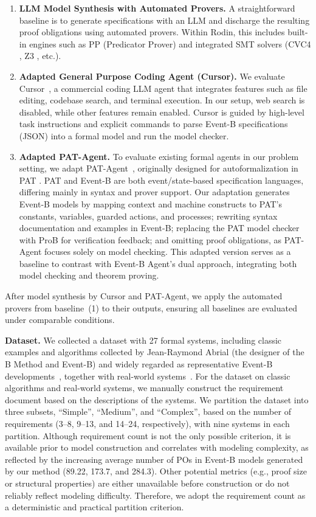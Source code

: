\begin{enumerate}
    \item \textbf{LLM Model Synthesis with Automated Provers.} A straightforward baseline is to generate specifications with an LLM and discharge the resulting proof obligations using automated provers. Within Rodin, this includes built-in engines such as PP (Predicator Prover) and integrated SMT solvers (CVC4 \cite{barrett2011cvc4}, Z3 \cite{de2008z3}, etc.).
    \item \textbf{Adapted General Purpose Coding Agent (Cursor).} We evaluate Cursor~\cite{CursorAI}, a commercial coding LLM agent that integrates features such as file editing, codebase search, and terminal execution. In our setup, web search is disabled, while other features remain enabled. Cursor is guided by high-level task instructions and explicit commands to parse Event-B specifications (JSON) into a formal model and run the model checker.
    \item \textbf{Adapted PAT-Agent.} To evaluate existing formal agents in our problem setting, we adapt PAT-Agent~\cite{zuo2025pat}, originally designed for autoformalization in PAT \cite{sun2009pat}. PAT and Event-B are both event/state-based specification languages, differing mainly in syntax and prover support. Our adaptation generates Event-B models by mapping context and machine constructs to PAT’s constants, variables, guarded actions, and processes; rewriting syntax documentation and examples in Event-B; replacing the PAT model checker with ProB for verification feedback; and omitting proof obligations, as PAT-Agent focuses solely on model checking. This adapted version serves as a baseline to contrast with Event-B Agent’s dual approach, integrating both model checking and theorem proving.
\end{enumerate}
After model synthesis by Cursor and PAT-Agent, we apply the automated provers from baseline~(1) to their outputs, ensuring all baselines are evaluated under comparable conditions.

\noindent \textbf{Dataset.}
We collected a dataset with 27 formal systems, including classic examples and algorithms collected by Jean-Raymond Abrial (the designer of the B Method and Event-B) and widely regarded as representative Event-B developments~\cite{abrial2010modeling}, together with real-world systems~\cite{riviere2025extending, riviere2023formalising}.
For the dataset on classic algorithms and real-world systems, we manually construct the requirement document based on the descriptions of the systems.
We partition the dataset into three subsets, ``Simple'', ``Medium'', and ``Complex'', based on the number of requirements (3–8, 9–13, and 14–24, respectively), with nine systems in each partition.
Although requirement count is not the only possible criterion, it is available prior to model construction and correlates with modeling complexity, as reflected by the increasing average number of POs in Event-B models generated by our method (89.22, 173.7, and 284.3).
Other potential metrics (e.g., proof size or structural properties) are either unavailable before construction or do not reliably reflect modeling difficulty.
Therefore, we adopt the requirement count as a deterministic and practical partition criterion.

